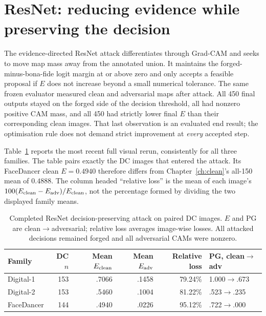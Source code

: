 \section{ResNet: reducing evidence while preserving the decision}
\label{sec:adv-resnet-evidence}

The evidence-directed ResNet attack differentiates through Grad-CAM and seeks to move map mass away from the annotated union. It maintains the forged-minus-bona-fide logit margin at or above zero and only accepts a feasible proposal if $E$ does not increase beyond a small numerical tolerance. The same frozen evaluator measured clean and adversarial maps after attack. All 450 final outputs stayed on the forged side of the decision threshold, all had nonzero positive CAM mass, and all 450 had strictly lower final $E$ than their corresponding clean images. That last observation is an evaluated end result; the optimisation rule does not demand strict improvement at \emph{every} accepted step.

Table~\ref{tab:adv-resnet-e} reports the most recent full visual rerun, consistently for all three families. The table pairs exactly the DC images that entered the attack. Its FaceDancer clean $E=0.4940$ therefore differs from Chapter~\ref{ch:clean}'s all-150 mean of $0.4888$. The column headed ``relative loss'' is the mean of each image's $100(E_{\rm clean}-E_{\rm adv})/E_{\rm clean}$, not the percentage formed by dividing the two displayed family means.

\begin{table}[htbp]
\centering\small
\caption{Completed ResNet decision-preserving attack on paired DC images. $E$ and PG are clean$\rightarrow$adversarial; relative loss averages image-wise losses. All attacked decisions remained forged and all adversarial CAMs were nonzero.}
\label{tab:adv-resnet-e}
\begin{tabular}{@{}lrrrrl@{}}
\toprule
Family & DC $n$ & Mean $E_{\rm clean}$ & Mean $E_{\rm adv}$ & Relative loss & PG, clean$\rightarrow$adv \\
\midrule
Digital-1 & 153 & .7066 & .1458 & 79.24\% & 1.000$\rightarrow$.673 \\
Digital-2 & 153 & .5460 & .1004 & 81.22\% & .523$\rightarrow$.235 \\
FaceDancer & 144 & .4940 & .0226 & 95.12\% & .722$\rightarrow$.000 \\
\bottomrule
\end{tabular}
\end{table}

